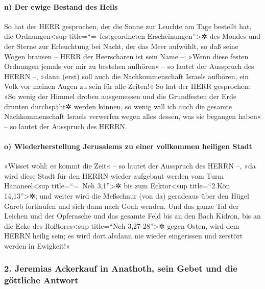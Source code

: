 \hypertarget{n-der-ewige-bestand-des-heils}{%
\paragraph{n) Der ewige Bestand des
Heils}\label{n-der-ewige-bestand-des-heils}}

So hat der HERR gesprochen, der die Sonne zur Leuchte am
Tage bestellt hat, die Ordnungen\textless sup title=``=~festgeordneten
Erscheinungen''\textgreater✲ des Mondes und der Sterne zur Erleuchtung
bei Nacht, der das Meer aufwühlt, so daß seine Wogen brausen -- HERR der
Heerscharen ist sein Name --: »Wenn diese festen
Ordnungen jemals vor mir zu bestehen aufhören« -- so lautet der
Ausspruch des HERRN --, »dann (erst) soll auch die Nachkommenschaft
Israels aufhören, ein Volk vor meinen Augen zu sein für alle Zeiten!«
So hat der HERR gesprochen: »So wenig der Himmel droben
ausgemessen und die Grundfesten der Erde drunten durchspäht✲ werden
können, so wenig will ich auch die gesamte Nachkommenschaft Israels
verwerfen wegen alles dessen, was sie begangen haben« -- so lautet der
Ausspruch des HERRN.

\hypertarget{o-wiederherstellung-jerusalems-zu-einer-vollkommen-heiligen-stadt}{%
\paragraph{o) Wiederherstellung Jerusalems zu einer vollkommen heiligen
Stadt}\label{o-wiederherstellung-jerusalems-zu-einer-vollkommen-heiligen-stadt}}

»Wisset wohl: es kommt die Zeit« -- so lautet der
Ausspruch des HERRN --, »da wird diese Stadt für den HERRN wieder
aufgebaut werden vom Turm Hananeel\textless sup title=``=~Neh
3,1''\textgreater✲ bis zum Ecktor\textless sup title=``2.Kön
14,13''\textgreater✲; und weiter wird die Meßschnur (von
da) geradeaus über den Hügel Gareb fortlaufen und sich dann nach Goah
wenden. Und das ganze Tal der Leichen und der Opferasche
und das gesamte Feld bis an den Bach Kidron, bis an die Ecke des
Roßtores\textless sup title=``Neh 3,27-28''\textgreater✲ gegen Osten,
wird dem HERRN heilig sein; es wird dort alsdann nie wieder eingerissen
und zerstört werden in Ewigkeit!«

\hypertarget{jeremias-ackerkauf-in-anathoth-sein-gebet-und-die-guxf6ttliche-antwort}{%
\subsubsection{2. Jeremias Ackerkauf in Anathoth, sein Gebet und die
göttliche
Antwort}\label{jeremias-ackerkauf-in-anathoth-sein-gebet-und-die-guxf6ttliche-antwort}}

